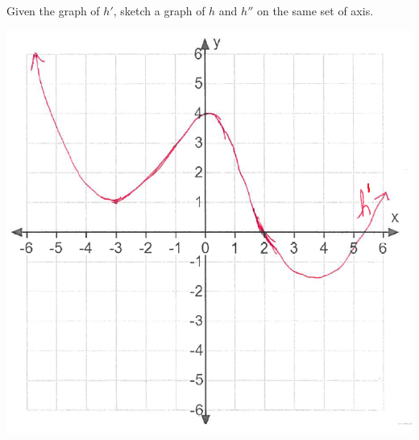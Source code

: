 \documentclass[nooutcomes,handout]{ximera}
\begin{document}
\begin{problem}
\begin{enumerate}
  \end{enumerate}
\end{problem}

	
	
\begin{problem}
Given the graph of $h'$, sketch a graph of $h$ and $h''$ on the same set of axis.
      \begin{image}
        \includegraphics[scale = 0.6]{figure1.png}
      \end{image}



\begin{freeResponse} \hfil



\end{freeResponse}
\end{problem}
\end{document}
